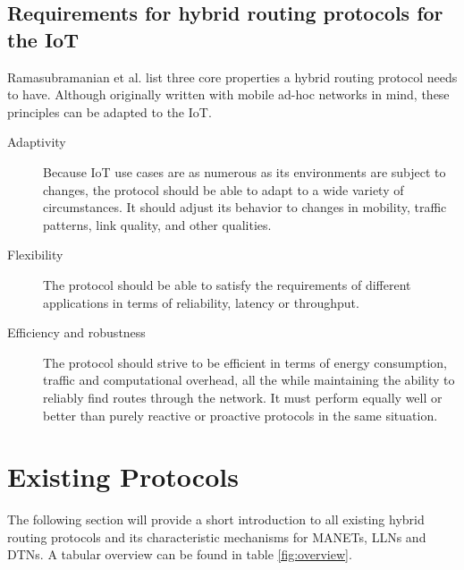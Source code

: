 \documentclass[a4paper,10pt]{scrartcl}
\begin{document}
\subsection{Requirements for hybrid routing protocols for the IoT}
\label{subsec:requirements}
Ramasubramanian et al. \cite{SHARP} list three core properties a hybrid routing protocol needs to have. Although originally written with mobile ad-hoc networks in mind, these principles can be adapted to the IoT.
\begin{description}
\item[Adaptivity] Because IoT use cases are as numerous as its environments are subject to changes, the protocol should be able to adapt to a wide variety of circumstances. It should adjust its behavior to changes in mobility, traffic patterns, link quality, and other qualities.
\item[Flexibility] The protocol should be able to satisfy the requirements of different applications in terms of reliability, latency or throughput.
\item[Efficiency and robustness] The protocol should strive to be efficient in terms of energy consumption, traffic and computational overhead, all the while maintaining the ability to reliably find routes through the network. It must perform equally well or better than purely reactive or proactive protocols in the same situation.
\end{description}

\section{Existing Protocols}
\label{sec:existing_protocols}
The following section will provide a short introduction to all existing hybrid routing protocols and its characteristic mechanisms for \glspl{MANET}, \glspl{LLN} and \glspl{DTN}. A tabular overview can be found in table \ref{fig:overview}.
\end{document}
